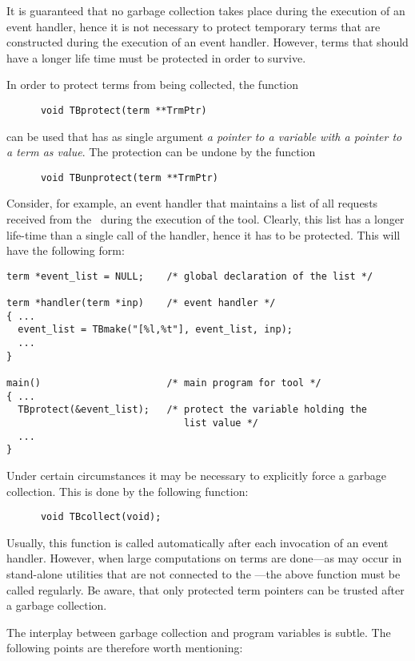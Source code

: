 \documentclass[a4,twoside,noweb]{article} %
\begin{document}
It is guaranteed that no garbage collection takes place during
the execution of an event handler, hence it is not necessary to
protect temporary terms that are constructed during the execution
of an event handler.
However, terms that should have a longer life time must be protected
in order to survive.

In order to protect terms from being collected, the function
\begin{verbatim}
      void TBprotect(term **TrmPtr)
\end{verbatim}
can be used that has as single argument {\em a pointer to a variable
with a pointer to a term as value}. The protection can be undone
by the function
\begin{verbatim}
      void TBunprotect(term **TrmPtr)
\end{verbatim}

Consider, for example, an event handler that maintains a list
of all requests received from the \TB\ during the execution
of the tool. Clearly, this list has a longer life-time than
a single call of the handler, hence it has to be protected.
This will have the following form:
\begin{verbatim}
term *event_list = NULL;    /* global declaration of the list */

term *handler(term *inp)    /* event handler */
{ ...
  event_list = TBmake("[%l,%t"], event_list, inp);
  ...
}

main()                      /* main program for tool */
{ ...
  TBprotect(&event_list);   /* protect the variable holding the
                               list value */
  ...
}
\end{verbatim}

Under certain circumstances it may be necessary to explicitly force
a garbage collection. This is done by the following function:
\begin{verbatim}
      void TBcollect(void);
\end{verbatim}

Usually, this function is called automatically after each invocation
of an event handler. However, when large computations on terms are done---as
may occur in stand-alone utilities that are not connected to
the \TB---the above function must be called regularly.
Be aware, that only protected term pointers can be trusted
after a garbage collection.

The interplay between garbage collection and program variables
is subtle. The following points are therefore worth  mentioning:
\end{document}
